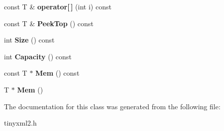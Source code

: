 \begin{DoxyCompactItemize}
\item 
const T \& {\bfseries operator\mbox{[}$\,$\mbox{]}} (int i) const \hypertarget{classtinyxml2_1_1_dyn_array_ac97d6ddabbcdb098f155e7fc11ea5d91}{}\label{classtinyxml2_1_1_dyn_array_ac97d6ddabbcdb098f155e7fc11ea5d91}

\item 
const T \& {\bfseries Peek\+Top} () const \hypertarget{classtinyxml2_1_1_dyn_array_a5658d49c056707f14b089b53c358eb11}{}\label{classtinyxml2_1_1_dyn_array_a5658d49c056707f14b089b53c358eb11}

\item 
int {\bfseries Size} () const \hypertarget{classtinyxml2_1_1_dyn_array_a5c3874dd4d5d0bf32919161b19ac7287}{}\label{classtinyxml2_1_1_dyn_array_a5c3874dd4d5d0bf32919161b19ac7287}

\item 
int {\bfseries Capacity} () const \hypertarget{classtinyxml2_1_1_dyn_array_a5ab6ef31e984e5cf78d0eb70ad3aec6d}{}\label{classtinyxml2_1_1_dyn_array_a5ab6ef31e984e5cf78d0eb70ad3aec6d}

\item 
const T $\ast$ {\bfseries Mem} () const \hypertarget{classtinyxml2_1_1_dyn_array_aef95a07fb624948d8ce3e638ab2e1f8b}{}\label{classtinyxml2_1_1_dyn_array_aef95a07fb624948d8ce3e638ab2e1f8b}

\item 
T $\ast$ {\bfseries Mem} ()\hypertarget{classtinyxml2_1_1_dyn_array_a2f0842cd666e2ad951f1a8bd6561fa40}{}\label{classtinyxml2_1_1_dyn_array_a2f0842cd666e2ad951f1a8bd6561fa40}

\end{DoxyCompactItemize}


The documentation for this class was generated from the following file\+:\begin{DoxyCompactItemize}
\item 
tinyxml2.\+h\end{DoxyCompactItemize}

